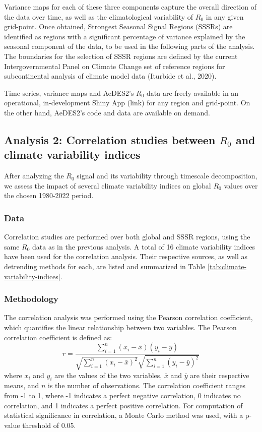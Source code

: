 \documentclass[fleqn,10pt]{wlscirep}
\begin{document}
  Variance maps for each of these three components capture the overall direction of the data over time, as well as the climatological variability of $R_0$ in any given grid-point. Once obtained, Strongest Seasonal Signal Regions (SSSRs) are identified as regions with a significant percentage of variance explained by the seasonal component of the data, to be used in the following parts of the analysis. The boundaries for the selection of SSSR regions are defined by the current Intergovernmental Panel on Climate Change set of reference regions for subcontinental analysis of climate model data (Iturbide et al., 2020).  

  Time series, variance maps and AeDES2's $R_0$ data are freely available in an operational, in-development Shiny App (link) for any region and grid-point. On the other hand, AeDES2's code and data are available on demand.

  \subsection{Analysis 2: Correlation studies between $R_0$ and climate variability indices} \label{sec-methods-2}

  After analyzing the $R_0$ signal and its variability through timescale decomposition, we assess the impact of several climate variability indices on global $R_0$ values over the chosen 1980-2022 period.  

  \subsubsection{Data} \label{sec-methods-2-data}

  Correlation studies are performed over both global and SSSR regions, using the same $R_0$ data as in the previous analysis. A total of 16 climate variability indices have been used for the correlation analysis. Their respective sources, as well as detrending methods for each, are listed and summarized in Table \ref{tab:climate-variability-indices}.

  \subsubsection{Methodology} \label{sec-methods-2-methodology}

  The correlation analysis was performed using the Pearson correlation coefficient, which quantifies the linear relationship between two variables. The Pearson correlation coefficient is defined as:
  \begin{equation}
      r = \frac{\sum_{i=1}^{n} (x_i - \bar{x})(y_i - \bar{y})}{\sqrt{\sum_{i=1}^{n} (x_i - \bar{x})^2} \sqrt{\sum_{i=1}^{n} (y_i - \bar{y})^2}}
  \end{equation}
  where $x_i$ and $y_i$ are the values of the two variables, $\bar{x}$ and $\bar{y}$ are their respective means, and $n$ is the number of observations. The correlation coefficient ranges from -1 to 1, where -1 indicates a perfect negative correlation, 0 indicates no correlation, and 1 indicates a perfect positive correlation. For computation of statistical significance in correlation, a Monte Carlo method was used, with a p-value threshold of 0.05.
\end{document}
